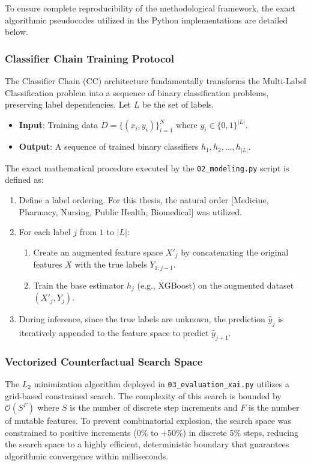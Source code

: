 To ensure complete reproducibility of the methodological framework, the exact algorithmic pseudocodes utilized in the Python implementations are detailed below.

\subsubsection{Classifier Chain Training Protocol}
The Classifier Chain \parencite{read2011classifier} (CC) architecture fundamentally transforms the Multi-Label \parencite{tsoumakas2007multi} Classification problem into a sequence of binary classification problems, preserving label dependencies. Let $L$ be the set of labels.

\begin{itemize}
    \item \textbf{Input}: Training data $D = \{(x_i, y_i)\}_{i=1}^N$ where $y_i \in \{0,1\}^{|L|}$.
    \item \textbf{Output}: A sequence of trained binary classifiers $h_1, h_2, \dots, h_{|L|}$.
\end{itemize}
The exact mathematical procedure executed by the \texttt{02\_modeling.py} script is defined as:
\begin{enumerate}
    \item Define a label ordering. For this thesis, the natural order [Medicine, Pharmacy, Nursing, Public Health, Biomedical] was utilized.
    \item For each label $j$ from $1$ to $|L|$:
    \begin{enumerate}
        \item Create an augmented feature space $X'_j$ by concatenating the original features $X$ with the true labels $Y_{1:j-1}$.
        \item Train the base estimator $h_j$ (e.g., XGBoost) on the augmented dataset $(X'_j, Y_j)$.
    \end{enumerate}
    \item During inference, since the true labels are unknown, the prediction $\hat{y}_j$ is iteratively appended to the feature space to predict $\hat{y}_{j+1}$.
\end{enumerate}

\subsubsection{Vectorized Counterfactual \parencite{wachter2017counterfactual} Search Space}
The $L_2$ minimization algorithm deployed in \texttt{03\_evaluation\_xai.py} utilizes a grid-based constrained search. The complexity of this search is bounded by $\mathcal{O}(S^F)$ where $S$ is the number of discrete step increments and $F$ is the number of mutable features. 
To prevent combinatorial explosion, the search space was constrained to positive increments (0\% to +50\%) in discrete 5\% steps, reducing the search space to a highly efficient, deterministic boundary that guarantees algorithmic convergence within milliseconds.

